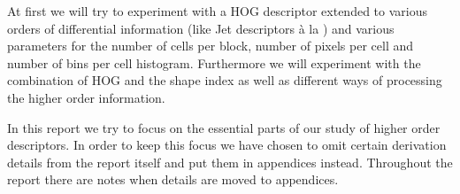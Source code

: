 \documentclass[thesis.tex]{subfiles}
\begin{document}
At first we will try to experiment with a HOG descriptor extended to various orders of differential information (like Jet descriptors à la \cite{larsen2012jet}) and various parameters for the number of cells per block, number of pixels per cell and number of bins per cell histogram. Furthermore we will experiment with the combination of HOG and the shape index \cite{koenderink1992surface} as well as different ways of processing the higher order information.


In this report we try to focus on the essential parts of our study of higher order descriptors. In order to keep this focus we have chosen to omit certain derivation details from the report itself and put them in appendices instead. Throughout the report there are notes when details are moved to appendices.



\subbibliography
\end{document}
